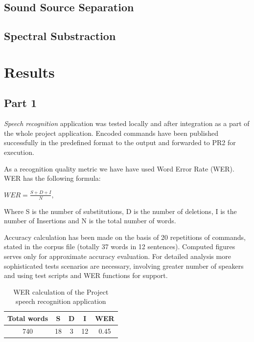 \documentclass[11pt,a4paper]{report}
\begin{document}
\section{Sound Source Separation}
\section{Spectral Substraction}

\chapter {Results}
\label {sec:results}
\section {Part 1}

\textit {Speech recognition} application was tested locally and after
integration as a part of the whole project application. Encoded commands have been published successfully in the
predefined format to the output and forwarded to PR2 for execution. 

 As a
recognition quality metric we have have used Word Error Rate (WER).  WER has the
following formula:
\begin {center}
$WER=\frac {S+D+I}N$, 
\end {center}
Where S is the number of substitutions, D is the number of
deletions, I is the number of Insertions and N is the total number of words.

 Accuracy calculation has been made on the basis of 20
repetitions of commands, stated in the corpus file (totally 37 words in 12 sentences). Computed figures 
serves only for approximate accuracy evaluation.  For detailed analysis more
sophisticated tests scenarios are necessary, involving greater number of
speakers and using test scripts and WER functions for support. 
\begin {table}[h]
\begin{center}
\begin{tabular}[h]{| c || c || c ||c || c|} \hline
Total words & S & D & I  & WER\\ \hline
740 & 18 & 3 & 12 & 0.45  \\
\hline
\end{tabular}
\caption {WER calculation of the Project speech recognition application}
\label {table:WER}
\end {center}  
\end {table} 
 
\end{document}
